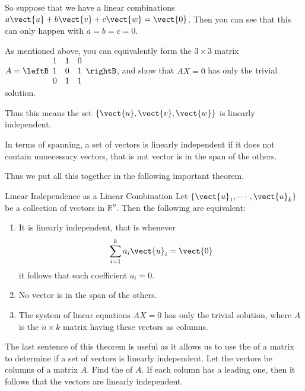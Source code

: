 \begin{solution}
So suppose that we have a linear combinations $a\vect{u} + b \vect{v}
+ c\vect{w} = \vect{0}$. Then you can see that this can only happen
with $a=b=c=0$.

As mentioned above, you can equivalently form the $3 \times 3$ matrix $A = 
\leftB 
\begin{array}{ccc}
1  & 1 & 0 \\
1  & 0 & 1 \\
0  & 1 & 1 \\
\end{array}
\rightB$, and show that $AX=0$ has only the trivial solution.

Thus this  means the set $\left\{ \vect{u}, \vect{v}, \vect{w} \right\}$ is linearly independent. 
\end{solution}

In terms of spanning, a set of vectors is linearly independent if it
does not contain unnecessary vectors, that is not vector is in the span of the others.

Thus we put all this together in the following important theorem.

\begin{theorem}{Linear Independence as a Linear Combination}\label{thm:linearindependencecombination}
Let $\left\{\vect{u}_{1},\cdots ,\vect{u}_{k}\right\}$ be a collection of vectors  in
$\mathbb{R}^{n}$. Then the following are equivalent:

\begin{enumerate}
\item It is linearly independent, that is whenever
\begin{equation*}
\sum_{i=1}^{k}a_{i}\vect{u}_{i}=\vect{0}
\end{equation*}
it follows that each coefficient $a_{i}=0$.
\item No vector is in the span of the others.
\item The system of
linear equations $AX=0$ has only the trivial solution, where $A$ is
the $n \times k$ matrix having these vectors as columns. 
\end{enumerate}
\end{theorem}

The last sentence of this theorem is useful as it allows us to use the
\rref\; of a matrix to determine if a set of vectors is linearly
independent. Let the vectors be columns of a matrix $A$. Find the
\rref \; of $A$. If each column has a leading one, then it follows
that the vectors are linearly independent.

